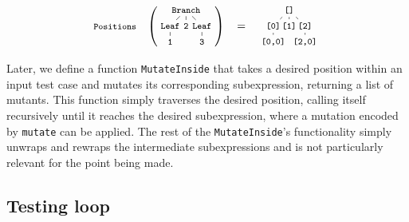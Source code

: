 \documentclass[sigconf, anonymous, review]{acmart}
\begin{document}
\vspace{-5pt}
\begin{equation}
  \nonumber
  \footnotesize
  \texttt{Positions}\quad
  \left(
  \tikz[
    baseline=-6mm,
    level distance=0.5cm,
    level 1/.style={sibling distance=0.5cm},
    level 2/.style={sibling distance=0.5cm}
  ]{
    \node {\texttt{Branch}}
      child {node {\texttt{Leaf}}
        child {node {\texttt{1}}}
      }
      child {node {\texttt{2}}}
      child {node {\texttt{Leaf}}
        child {node {\texttt{3}}}
      };
  }
  \right)
  \quad
  =
  \quad
  \tikz[
    baseline=-6mm,
    level distance=0.5cm,
    level 1/.style={sibling distance=0.5cm},
    level 2/.style={sibling distance=0.5cm}
  ]{
    \node {\texttt{[]}}
      child {node {\texttt{[0]}}
        child {node {\texttt{[0,0]}}}
      }
      child {node {\texttt{[1]}}}
      child {node {\texttt{[2]}}
        child {node {\texttt{[2,0]}}}
      };
  }
\end{equation}

Later, we define a function \texttt{MutateInside} that takes a desired position
within an input test case and mutates its corresponding subexpression, returning
a list of mutants.
%
%
%
%
This function simply traverses the desired position, calling itself recursively
until it reaches the desired subexpression, where a mutation encoded by \texttt{mutate} can be
applied.
%
The rest of the \texttt{MutateInside}'s functionality simply unwraps and rewraps the
intermediate subexpressions and is not particularly relevant for the point being
made.


\subsection{Testing loop}
\end{document}
